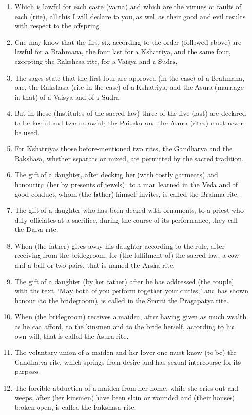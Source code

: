 \begin{enumerate}
\item Which is lawful for each caste (varna) and which are the virtues or faults of each (rite), all this I will declare to you, as well as their good and evil results with respect to the offspring.
\item One may know that the first six according to the order (followed above) are lawful for a Brahmana, the four last for a Kshatriya, and the same four, excepting the Rakshasa rite, for a Vaisya and a Sudra.
\item The sages state that the first four are approved (in the case) of a Brahmana, one, the Rakshasa (rite in the case) of a Kshatriya, and the Asura (marriage in that) of a Vaisya and of a Sudra.
\item But in these (Institutes of the sacred law) three of the five (last) are declared to be lawful and two unlawful; the Paisaka and the Asura (rites) must never be used.
\item For Kshatriyas those before-mentioned two rites, the Gandharva and the Rakshasa, whether separate or mixed, are permitted by the sacred tradition.
\item The gift of a daughter, after decking her (with costly garments) and honouring (her by presents of jewels), to a man learned in the Veda and of good conduct, whom (the father) himself invites, is called the Brahma rite.
\item The gift of a daughter who has been decked with ornaments, to a priest who duly officiates at a sacrifice, during the course of its performance, they call the Daiva rite.
\item When (the father) gives away his daughter according to the rule, after receiving from the bridegroom, for (the fulfilment of) the sacred law, a cow and a bull or two pairs, that is named the Arsha rite.
\item The gift of a daughter (by her father) after he has addressed (the couple) with the text, `May both of you perform together your duties,' and has shown honour (to the bridegroom), is called in the Smriti the Pragapatya rite.
\item When (the bridegroom) receives a maiden, after having given as much wealth as he can afford, to the kinsmen and to the bride herself, according to his own will, that is called the Asura rite.
\item The voluntary union of a maiden and her lover one must know (to be) the Gandharva rite, which springs from desire and has sexual intercourse for its purpose.
\item The forcible abduction of a maiden from her home, while she cries out and weeps, after (her kinsmen) have been slain or wounded and (their houses) broken open, is called the Rakshasa rite.

\end{enumerate}
